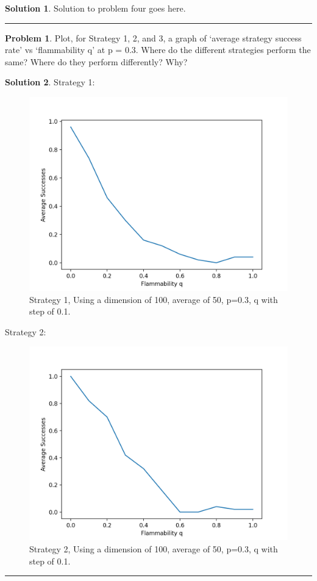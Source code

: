 \documentclass{article}
\theoremstyle{definition}
\newtheorem{problem}{Problem}
\def\fline{\rule{0.75\linewidth}{0.5pt}}
\newcommand{\finishline}{\vspace{-15pt}\begin{center}\fline\end{center}}
\newtheorem*{solution*}{Solution}
\newenvironment{solution}{\begin{solution*}}{{\finishline} \end{solution*}}
\begin{document}
\begin{solution}
	Solution to problem four goes here. 
\end{solution}

\smallskip

\begin{problem}
	Plot, for Strategy 1, 2, and 3, a graph of `average strategy success rate' vs `flammability q' at p = 0.3. Where do the different strategies perform the same? Where do they perform differently? Why?
\end{problem}

\smallskip

\begin{solution}
    Strategy 1:
	\begin{figure}[h]
    \centerline{\includegraphics{P6ST1.png}}
    \caption{Strategy 1, Using a dimension of 100, average of 50, p=0.3, q with step of 0.1.}
    \label{fig}
    \end{figure}
 
    
    Strategy 2: 
    \begin{figure}[h]
    \centerline{\includegraphics{P6ST2.png}}
    \caption{Strategy 2, Using a dimension of 100, average of 50, p=0.3, q with step of 0.1.}
    \label{fig}
    \end{figure}
    

\end{solution}
\end{document}
